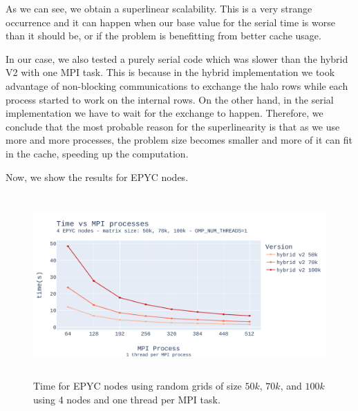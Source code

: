 \documentclass{report}
\begin{document}
As we can see, we obtain a superlinear scalability. This is a very strange 
occurrence and it can happen when our base value for the serial time is worse 
than it should be, or if the problem is benefitting from better cache usage. 

In our case, we also tested a purely serial code which was slower than the hybrid 
V2 with one MPI task. This is because in the 
hybrid implementation we took advantage of non-blocking communications to 
exchange the halo rows while each process started to work on the internal rows.
On the other hand, in the serial implementation we have to wait for the exchange
to happen. 
Therefore, we conclude that the most probable reason for the superlinearity 
is that as we use more and more processes, the problem size becomes smaller and 
more of it can fit in the cache, speeding up the computation.

Now, we show the results for EPYC nodes.

\begin{figure}[H]
\centering
\includegraphics[width=14cm, height=7cm]{./images/strong_MPI_epyc_hybrid_grid_100k.pdf}
\caption{\label{fig:strongmpiepychybrid} Time for EPYC nodes using random grids 
of size $50k$, $70k$, and $100k$ using 4 nodes and one thread per MPI task. }
\end{figure}
\end{document}
